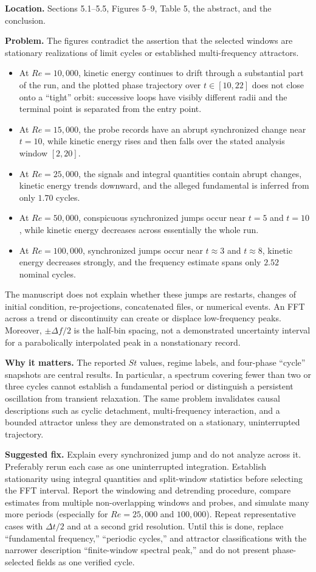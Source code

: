 \documentclass[11pt]{article}
\begin{document}
\textbf{Location.} Sections 5.1--5.5, Figures 5--9, Table 5, the abstract, and the conclusion.

\textbf{Problem.} The figures contradict the assertion that the selected windows are stationary realizations of limit cycles or established multi-frequency attractors.
\begin{itemize}
    \item At $Re=10{,}000$, kinetic energy continues to drift through a substantial part of the run, and the plotted phase trajectory over $t\in[10,22]$ does not close onto a ``tight'' orbit: successive loops have visibly different radii and the terminal point is separated from the entry point.
    \item At $Re=15{,}000$, the probe records have an abrupt synchronized change near $t=10$, while kinetic energy rises and then falls over the stated analysis window $[2,20]$.
    \item At $Re=25{,}000$, the signals and integral quantities contain abrupt changes, kinetic energy trends downward, and the alleged fundamental is inferred from only $1.70$ cycles.
    \item At $Re=50{,}000$, conspicuous synchronized jumps occur near $t=5$ and $t=10$, while kinetic energy decreases across essentially the whole run.
    \item At $Re=100{,}000$, synchronized jumps occur near $t\approx3$ and $t\approx8$, kinetic energy decreases strongly, and the frequency estimate spans only $2.52$ nominal cycles.
\end{itemize}
The manuscript does not explain whether these jumps are restarts, changes of initial condition, re-projections, concatenated files, or numerical events.  An FFT across a trend or discontinuity can create or displace low-frequency peaks.  Moreover, $\pm\Delta f/2$ is the half-bin spacing, not a demonstrated uncertainty interval for a parabolically interpolated peak in a nonstationary record.

\textbf{Why it matters.} The reported $St$ values, regime labels, and four-phase ``cycle'' snapshots are central results.  In particular, a spectrum covering fewer than two or three cycles cannot establish a fundamental period or distinguish a persistent oscillation from transient relaxation.  The same problem invalidates causal descriptions such as cyclic detachment, multi-frequency interaction, and a bounded attractor unless they are demonstrated on a stationary, uninterrupted trajectory.

\textbf{Suggested fix.} Explain every synchronized jump and do not analyze across it.  Preferably rerun each case as one uninterrupted integration.  Establish stationarity using integral quantities and split-window statistics before selecting the FFT interval.  Report the windowing and detrending procedure, compare estimates from multiple non-overlapping windows and probes, and simulate many more periods (especially for $Re=25{,}000$ and $100{,}000$).  Repeat representative cases with $\Delta t/2$ and at a second grid resolution.  Until this is done, replace ``fundamental frequency,'' ``periodic cycles,'' and attractor classifications with the narrower description ``finite-window spectral peak,'' and do not present phase-selected fields as one verified cycle.
\end{document}
